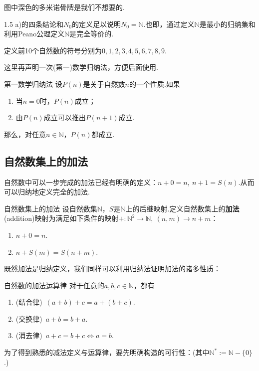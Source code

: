 \documentclass[lang=cn, zihao=5]{elegantbook}
\begin{document}
图中深色的多米诺骨牌是我们不想要的.

1.5 a)的四条结论和$N_0$的定义足以说明$N_0=\mathbb{N}$.也即，通过定义$\mathbb{N}$是最小的归纳集和利用Peano公理定义$\mathbb{N}$是完全等价的.

定义前10个自然数的符号分别为$0,1,2,3,4,5,6,7,8,9$.

这里再声明一次(第一)数学归纳法，方便后面使用.

\begin{theorem}{第一数学归纳法}
	设$P(n)$是关于自然数$n$的一个性质.如果
	\begin{enumerate}
		\item 当$n=0$时，$P(n)$成立；
		\item 由$P(n)$成立可以推出$P(n+1)$成立.
	\end{enumerate}
	那么，对任意$n \in \mathbb{N}$，$P(n)$都成立.
\end{theorem}

\subsection{自然数集上的加法}

自然数中可以一步完成的加法已经有明确的定义：$n+0=n,~n+1=S(n)$.从而可以归纳地定义完全的加法.

\begin{definition}{自然数集上的加法}
	设自然数集$\mathbb{N}$，$S$是$\mathbb{N}$上的后继映射.定义自然数集上的\textbf{加法}(addition)映射为满足如下条件的映射$+:\mathbb{N}^2 \to \mathbb{N},~(n,m) \to n+m$：
	\begin{enumerate}
		\item $n+0=n$.
		\item $n+S(m)=S(n+m)$.
	\end{enumerate}
\end{definition}

既然加法是归纳定义，我们同样可以利用归纳法证明加法的诸多性质：

\begin{proposition}{自然数的加法运算律}
	对于任意的$a,b,c \in \mathbb{N}$，都有
	\begin{enumerate}
		\item (结合律)~$(a+b)+c = a+(b+c)$.
		\item (交换律)~$a+b=b+a$.
		\item (消去律)~$a+c=b+c \Leftrightarrow a=b$.
	\end{enumerate}
\end{proposition}

为了得到熟悉的减法定义与运算律，要先明确构造的可行性：(其中$\mathbb{N}^* := \mathbb{N} - \{ 0 \}$.)
\end{document}
